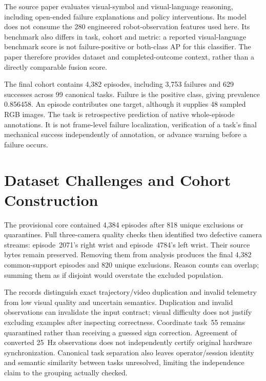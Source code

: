 The source paper evaluates visual-symbol and visual-language reasoning, including
open-ended failure explanations and policy interventions. Its model does not consume the
280 engineered robot-observation features used here. Its benchmark also differs in task,
cohort and metric: a reported visual-language benchmark score is not failure-positive or
both-class AP for this classifier. The paper therefore provides dataset and
completed-outcome context, rather than a directly comparable fusion score.

The final cohort contains 4,382 episodes, including 3,753 failures and 629 successes
across 99 canonical tasks. Failure is the positive class, giving prevalence 0.856458. An
episode contributes one target, although it supplies 48 sampled RGB images. The task is
retrospective prediction of native whole-episode annotations. It is not frame-level
failure localization, verification of a task's final mechanical success independently of
annotation, or advance warning before a failure occurs.

\section{Dataset Challenges and Cohort Construction}
The provisional core contained 4,384 episodes after 818 unique exclusions or
quarantines. Full three-camera quality checks then identified two defective camera
streams: episode~2071's right wrist and episode~4784's left wrist. Their source bytes
remain preserved. Removing them from analysis produces the final 4,382 common-support
episodes and 820 unique exclusions. Reason counts can overlap; summing them as if
disjoint would overstate the excluded population.

The records distinguish exact trajectory/video duplication and invalid telemetry from
low visual quality and uncertain semantics. Duplication and invalid observations can
invalidate the input contract; visual difficulty does not justify excluding examples
after inspecting correctness. Coordinate task~55 remains quarantined rather than
receiving a guessed sign correction. Agreement of converted 25~Hz observations does not
independently certify original hardware synchronization. Canonical task separation also
leaves operator/session identity and semantic similarity between tasks unresolved,
limiting the independence claim to the grouping actually checked.

